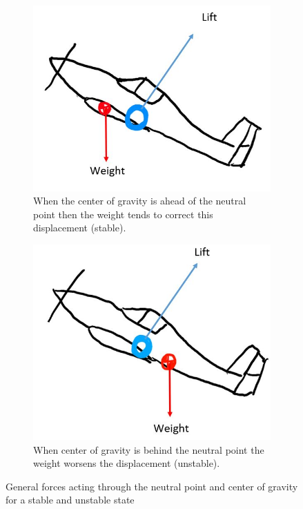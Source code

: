 \begin{figure}[H]
     \centering
     \begin{subfigure}[b]{0.45\textwidth}
         \centering
         \includegraphics[width=\textwidth]{02_Background/Figs/a3.JPG}
         \caption{When the center of gravity is ahead of the neutral point then the weight tends to correct this displacement (stable).}
         \label{fig:Pressa2a}
     \end{subfigure}
     \hfill
     \begin{subfigure}[b]{0.45\textwidth}
         \centering
         \includegraphics[width=\textwidth]{02_Background/Figs/b3.JPG}
         \caption{When center of gravity is behind the neutral point the weight worsens the displacement (unstable). }
         \label{fig:Pressa2b}
     \end{subfigure}
     \hfill
        \caption{General forces acting through the neutral point and center of gravity for a stable and unstable state}
    \label{fig:stable}
\end{figure}




